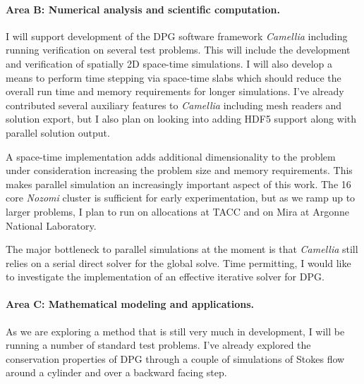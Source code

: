 \documentclass[Proposal.tex]{subfiles}
\begin{document}
\paragraph{Area B: Numerical analysis and scientific computation.}
I will support development of the DPG software framework \emph{Camellia}\cite{CamelliaDPG} including running verification on several test problems.
This will include the development and verification of spatially 2D space-time simulations.
I will also develop a means to perform time stepping via space-time slabs which should reduce the 
overall run time and memory requirements for longer simulations.
I've already contributed several auxiliary features to \emph{Camellia} including mesh readers and solution export, 
but I also plan on looking into adding HDF5 support along with parallel solution output.

A space-time implementation adds additional dimensionality to the problem under consideration increasing the problem size and memory requirements.
This makes parallel simulation an increasingly important aspect of this work.
The 16 core \emph{Nozomi} cluster is sufficient for early experimentation, but as we ramp up to larger problems, I plan to run on allocations at TACC and on Mira at Argonne National Laboratory.

The major bottleneck to parallel simulations at the moment is that \emph{Camellia} still relies on a serial direct solver for the global solve.
Time permitting, I would like to investigate the implementation of an effective iterative solver for DPG.

\paragraph{Area C: Mathematical modeling and applications.}
As we are exploring a method that is still very much in development, I will be running a number of standard test problems.
I've already explored the conservation properties of DPG through a couple of simulations of Stokes flow around a cylinder and over
a backward facing step.
\end{document}
